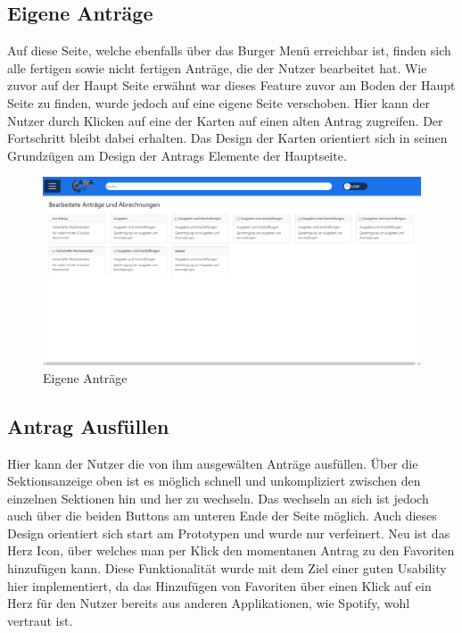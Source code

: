 \pagebreak

\subsection{Eigene Anträge}\label{Eigene Anträge}

Auf diese Seite, welche ebenfalls über das Burger Menü erreichbar ist, finden sich alle 
fertigen sowie nicht fertigen Anträge, die der Nutzer bearbeitet hat. Wie zuvor auf der 
Haupt Seite erwähnt war dieses Feature zuvor am Boden der Haupt Seite zu finden, wurde 
jedoch auf eine eigene Seite verschoben. Hier kann der Nutzer durch Klicken auf eine der 
Karten auf einen alten Antrag zugreifen. Der Fortschritt bleibt dabei erhalten. Das Design 
der Karten orientiert sich in seinen Grundzügen am Design der Antrags Elemente der 
Hauptseite.

\begin{figure}[h]
  \centering
    \includegraphics[width=1.0\textwidth]{Doc/images/Own Antraege.png}
    \caption{Eigene Anträge}\label{Eigene Daten}
\end{figure}

\pagebreak

\subsection{Antrag Ausfüllen}\label{Antrag Ausfüllen}

Hier kann der Nutzer die von ihm ausgewälten Anträge ausfüllen. Über die Sektionsanzeige 
oben ist es möglich schnell und unkompliziert zwischen den einzelnen Sektionen hin und her 
zu wechseln. Das wechseln an sich ist jedoch auch über die beiden Buttons am unteren Ende 
der Seite möglich. Auch dieses Design orientiert sich start am Prototypen und wurde nur 
verfeinert. Neu ist das Herz Icon, über welches man per Klick den momentanen Antrag zu den 
Favoriten hinzufügen kann. Diese Funktionalität wurde mit dem Ziel einer guten Usability 
hier implementiert, da das Hinzufügen von Favoriten über einen Klick auf ein Herz für 
den Nutzer bereits aus anderen Applikationen, wie Spotify, wohl vertraut ist.


